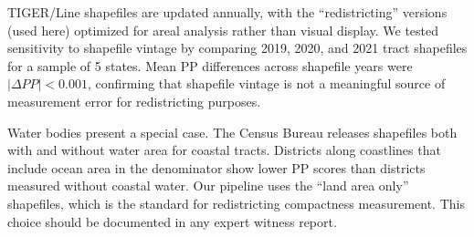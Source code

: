 TIGER/Line shapefiles are updated annually, with the ``redistricting''
versions (used here) optimized for areal analysis rather than visual
display. We tested sensitivity to shapefile vintage by comparing 2019,
2020, and 2021 tract shapefiles for a sample of 5 states. Mean PP
differences across shapefile years were $|\Delta PP| < 0.001$,
confirming that shapefile vintage is not a meaningful source of
measurement error for redistricting purposes.

Water bodies present a special case. The Census Bureau releases
shapefiles both with and without water area for coastal tracts.
Districts along coastlines that include ocean area in the denominator
show lower PP scores than districts measured without coastal water.
Our pipeline uses the ``land area only'' shapefiles, which is the
standard for redistricting compactness measurement. This choice should
be documented in any expert witness report.
